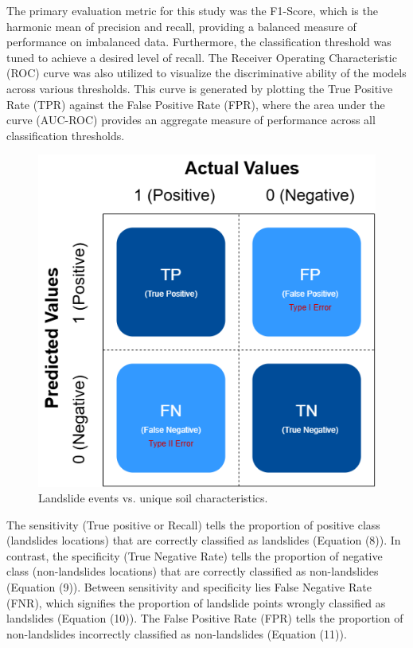 The primary evaluation metric for this study was the F1-Score, which is the harmonic mean of precision and recall, providing a balanced measure of performance on imbalanced data. Furthermore, the classification threshold was tuned to achieve a desired level of recall. The Receiver Operating Characteristic (ROC) curve was also utilized to visualize the discriminative ability of the models across various thresholds. This curve is generated by plotting the True Positive Rate (TPR) against the False Positive Rate (FPR), where the area under the curve (AUC-ROC) provides an aggregate measure of performance across all classification thresholds.
\begin{figure}[H]
    \centerline{\includegraphics[width=\linewidth]{fig5.png}}
    \caption{Landslide events vs. unique soil characteristics.}
    \label{fig}
\end{figure}

The sensitivity (True positive or Recall) tells the proportion of positive class (landslides locations) that are correctly classified as landslides (Equation (8)). In contrast, the specificity (True Negative Rate) tells the proportion of negative class (non-landslides locations) that are correctly classified as non-landslides (Equation (9)). Between sensitivity and specificity lies False Negative Rate (FNR), which signifies the proportion of landslide points wrongly classified as landslides (Equation (10)). The False Positive Rate (FPR) tells the proportion of non-landslides incorrectly classified as non-landslides (Equation (11)).

